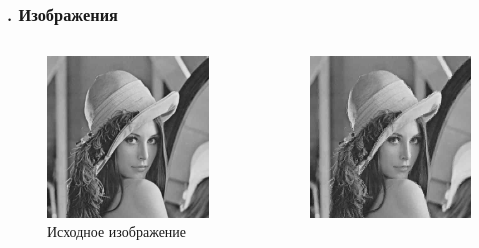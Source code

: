 \documentclass[t aspectratio=169]{beamer}
\begin{document}
  \begin{frame}\frametitle{\insertsection . Изображения}
    \begin{columns}
      \large
      \begin{figure}
        \begin{center}
          \includegraphics[width=1\textwidth]{./images/orig.png}
          \caption{Исходное изображение}
        \end{center}
      \end{figure}
      \begin{figure}
        \begin{center}
          \includegraphics[width=1\textwidth]{./images/test.png}

\end{center}
\end{figure}
\end{columns}
\end{frame}
\end{document}
